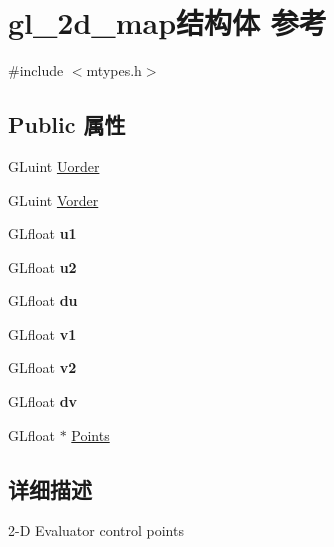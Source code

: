 \hypertarget{structgl__2d__map}{}\section{gl\+\_\+2d\+\_\+map结构体 参考}
\label{structgl__2d__map}


{\ttfamily \#include $<$mtypes.\+h$>$}

\subsection*{Public 属性}
\begin{DoxyCompactItemize}
\item 
G\+Luint \hyperlink{structgl__2d__map_a39f647e98f9ea83e922a9915290ed418}{Uorder}
\item 
G\+Luint \hyperlink{structgl__2d__map_a9f67d8b31aa1e8a6d96cd41977f9c6a8}{Vorder}
\item 
\mbox{\label{structgl__2d__map_a5cdf6be30da1d3e42afe158e74bdb0f3}} 
G\+Lfloat {\bfseries u1}
\item 
\mbox{\label{structgl__2d__map_affce60ba277021fca526011360f918ae}} 
G\+Lfloat {\bfseries u2}
\item 
\mbox{\label{structgl__2d__map_af688756fc68b4ea5bb74b627e84c5bda}} 
G\+Lfloat {\bfseries du}
\item 
\mbox{\label{structgl__2d__map_a436c0e9843fdc7aab41ccdac696fea62}} 
G\+Lfloat {\bfseries v1}
\item 
\mbox{\label{structgl__2d__map_a5e58d1100f1d10191dbd1ae14f2cae1e}} 
G\+Lfloat {\bfseries v2}
\item 
\mbox{\label{structgl__2d__map_a101654ec97317d506f6e4b757adb2e67}} 
G\+Lfloat {\bfseries dv}
\item 
G\+Lfloat $\ast$ \hyperlink{structgl__2d__map_aca2aaf2e65c5b88f2161131fcae16c5e}{Points}
\end{DoxyCompactItemize}


\subsection{详细描述}
2-\/D Evaluator control points 

